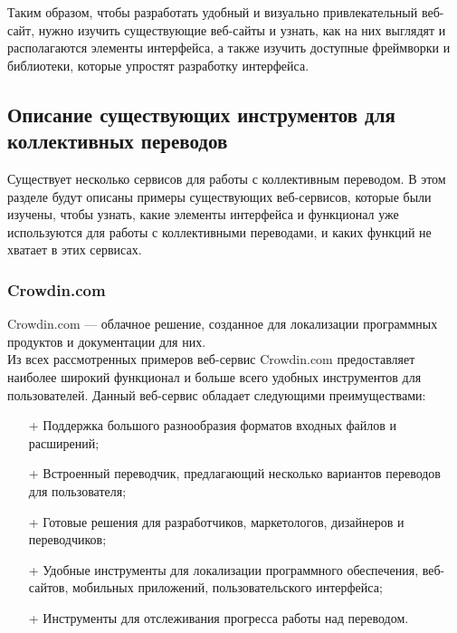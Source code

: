 \documentclass[a4paper,12pt]{article}
\begin{document}
Таким образом, чтобы разработать удобный и визуально привлекательный веб-сайт, нужно изучить существующие веб-сайты и узнать, как на них выглядят и располагаются элементы интерфейса, а также изучить доступные фреймворки и библиотеки, которые упростят разработку интерфейса.

\subsection{Описание существующих инструментов для коллективных переводов}

Существует несколько сервисов для работы с коллективным переводом. В этом разделе будут описаны примеры существующих веб-сервисов, которые были изучены, чтобы узнать, какие элементы интерфейса и функционал уже используются для работы с коллективными переводами, и каких функций не хватает в этих сервисах.\\

\subsubsection{Crowdin.com}
Crowdin.com — облачное решение, созданное для локализации программных продуктов и документации для них.  \cite{website:crowdin}\\
Из всех рассмотренных примеров веб-сервис Crowdin.com предоставляет наиболее широкий функционал и больше всего удобных инструментов для пользователей. Данный веб-сервис обладает следующими преимуществами:
\begin{itemize}
	\item[+] Поддержка большого разнообразия форматов входных файлов и расширений;
	\item[+] Встроенный переводчик, предлагающий несколько вариантов переводов для пользователя;
	\item[+] Готовые решения для разработчиков, маркетологов, дизайнеров и переводчиков;
	\item[+] Удобные инструменты для локализации программного обеспечения, веб-сайтов, мобильных приложений, пользовательского интерфейса;
	\item[+] Инструменты для отслеживания прогресса работы над переводом.
\end{itemize}
\end{document}
